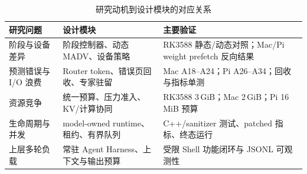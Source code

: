 \begin{table}[H]
  \centering
  \small
  \caption{研究动机到设计模块的对应关系}
  \label{tab:problem-design-map}
  \begin{tabular}{p{}p{}p{}}
    \toprule
    研究问题 & 设计模块 & 主要验证 \\
    \midrule
    阶段与设备差异 & 阶段控制器、动态 MADV、设备策略 & RK3588 静态/动态对照；Mac/Pi weight prefetch 反向结果 \\
    预测错误与 I/O 浪费 & Router token、错误页回收、专家驻留 & Mac A18--A24；Pi A26--A34；回收与指标单测 \\
    资源竞争 & 统一预算、压力准入、KV/计算协同 & RK3588 3\,GiB；Mac 2\,GiB；Pi 16\,MiB 预算 \\
    生命周期与并发 & model-owned runtime、租约、有界队列 & C++/sanitizer 测试、patched 指标、终态运行 \\
    上层多轮负载 & 常驻 Agent Harness、上下文与输出预算 & 受限 Shell 功能闭环与 JSONL 可观测性 \\
    \bottomrule
  \end{tabular}
\end{table}
